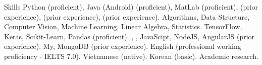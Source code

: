
\begin{rubric}{Skills}
%
	Python (proficient), Java (Android) (proficient), MatLab (proficient),  (prior experience),  (prior experience),  (prior experience).
%
	Algorithms, Data Structure, Computer Vision, Machine Learning, Linear Algebra, Statistics.
%
	TensorFlow, Keras, Scikit-Learn, Pandas (proficient).
%
	, , JavaScipt, NodeJS, AngularJS (prior experience).
\entry*[Databases]%
	My, MongoDB (prior experience).
\entry*[Languages]%
	English (professional working proficiency - IELTS 7.0). Vietnamese (native).
	Korean (basic).
\entry*[Misc.]%
	Academic research.
\end{rubric}